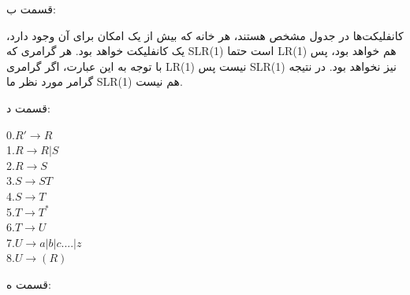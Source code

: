 قسمت ب:

کانفلیکت‌ها در جدول مشخص هستند، هر خانه که بیش از یک امکان برای آن وجود دارد، یک کانفلیکت خواهد بود.
هر گرامری که SLR(1) است حتما LR(1) هم خواهد بود، پس با توجه به این عبارت، اگر گرامری LR(1) نیست پس SLR(1) نیز نخواهد بود.
در نتیجه گرامر مورد نظر ما SLR(1) هم نیست.

قسمت د:

\begin{center}
    \begin{latin}
    0.$R' \rightarrow R$
    \\
    1.$R \rightarrow R|S$
    \\
    2.$R \rightarrow S$
    \\
    3.$S \rightarrow ST$
    \\
    4.$S \rightarrow T$
    \\
    5.$T \rightarrow {T}^{*}$
    \\
    6.$T \rightarrow U$
    \\
    7.$U \rightarrow a | b | c .... | z$
    \\
    8.$U \rightarrow (R)$
    \\
    \end{latin}
\end{center}

قسمت ه:

